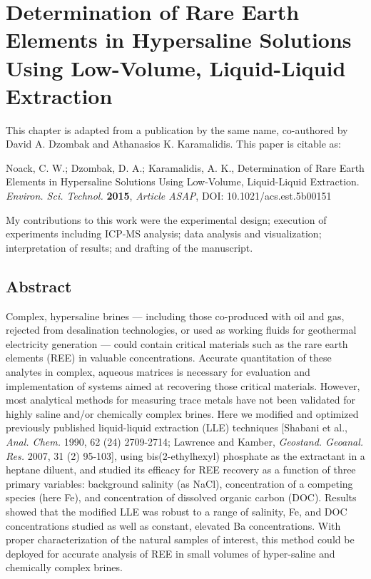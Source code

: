 \chapter{Determination of Rare Earth Elements in Hypersaline Solutions Using Low-Volume, Liquid-Liquid Extraction}\label{chap:LLE}

This chapter is adapted from a publication by the same name, co-authored by David A. Dzombak and Athanasios K. Karamalidis.
This paper is citable as: 

Noack, C. W.; Dzombak, D. A.; Karamalidis, A. K., Determination of Rare Earth Elements in Hypersaline Solutions Using Low-Volume, Liquid-Liquid Extraction. \textit{Environ. Sci. Technol.} \textbf{2015}, \textit{Article ASAP}, DOI: 10.1021/acs.est.5b00151

My contributions to this work were the experimental design; execution of experiments including ICP-MS analysis; data analysis and visualization; interpretation of results; and drafting of the manuscript.

\clearpage

\section*{Abstract}
Complex, hypersaline brines --- including those co-produced with oil and gas, rejected from desalination technologies, or used as working fluids for geothermal electricity generation --- could contain critical materials such as the rare earth elements (REE) in valuable concentrations.
Accurate quantitation of these analytes in complex, aqueous matrices is necessary for evaluation and implementation of systems aimed at recovering those critical materials.
However, most analytical methods for measuring trace metals have not been validated for highly saline and/or chemically complex brines.
Here we modified and optimized previously published liquid-liquid extraction (LLE) techniques [Shabani et al., \textit{Anal. Chem.} 1990, 62 (24) 2709-2714; Lawrence and Kamber, \textit{Geostand. Geoanal. Res.} 2007, 31 (2) 95-103], using bis(2-ethylhexyl) phosphate as the extractant in a heptane diluent, and studied its efficacy for REE recovery as a function of three primary variables: background salinity (as NaCl), concentration of a competing species (here Fe), and concentration of dissolved organic carbon (DOC).
Results showed that the modified LLE was robust to a range of salinity, Fe, and DOC concentrations studied as well as constant, elevated Ba concentrations.
With proper characterization of the natural samples of interest, this method could be deployed for accurate analysis of REE in small volumes of hyper-saline and chemically complex brines.

